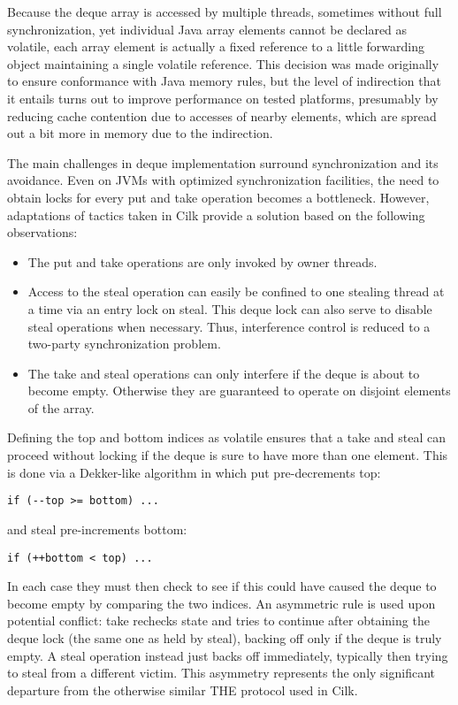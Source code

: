 Because the deque array is accessed by multiple threads, sometimes
without full synchronization, yet individual Java array elements
cannot be declared as volatile, each array element is actually a fixed
reference to a little forwarding object maintaining a single volatile
reference. This decision was made originally to ensure conformance
with Java memory rules, but the level of indirection that it entails
turns out to improve performance on tested platforms, presumably by
reducing cache contention due to accesses of nearby elements, which
are spread out a bit more in memory due to the indirection.

The main challenges in deque implementation surround synchronization
and its avoidance. Even on JVMs with optimized synchronization
facilities, the need to obtain locks for every put and take operation
becomes a bottleneck.  However, adaptations of tactics taken in Cilk
\cite{Frigo1998} provide a solution based on the following
observations:

\begin{itemize}
\item The put and take operations are only invoked by owner threads.
\item Access to the steal operation can easily be confined to one
  stealing thread at a time via an entry lock on steal. This deque
  lock can also serve to disable steal operations when
  necessary. Thus, interference control is reduced to a two-party
  synchronization problem.
\item The take and steal operations can only interfere if the deque is
  about to become empty. Otherwise they are guaranteed to operate on
  disjoint elements of the array.
\end{itemize}

Defining the top and bottom indices as volatile ensures that a take
and steal can proceed without locking if the deque is sure to have
more than one element. This is done via a Dekker-like algorithm in
which put pre-decrements top:

\begin{lstlisting}
if (--top >= bottom) ...
\end{lstlisting}

and steal pre-increments bottom:

\begin{lstlisting}
if (++bottom < top) ...
\end{lstlisting}

In each case they must then check to see if this could have caused the
deque to become empty by comparing the two indices. An asymmetric rule
is used upon potential conflict: take rechecks state and tries to
continue after obtaining the deque lock (the same one as held by
steal), backing off only if the deque is truly empty. A steal
operation instead just backs off immediately, typically then trying to
steal from a different victim. This asymmetry represents the only
significant departure from the otherwise similar THE protocol used in
Cilk.

